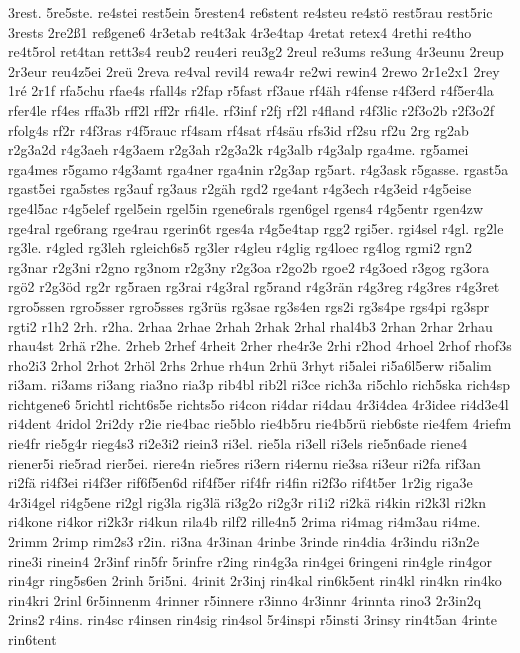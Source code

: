 {3rest.
5re5ste.
re4stei
rest5ein
5resten4
re6stent
re4steu
re4stö
rest5rau
rest5ric
3rests
2re2ß1
reßgene6
4r3etab
re4t3ak
4r3e4tap
4retat
retex4
4rethi
re4tho
re4t5rol
ret4tan
rett3s4
reub2
reu4eri
reu3g2
2reul
re3ums
re3ung
4r3eunu
2reup
2r3eur
reu4z5ei
2reü
2reva
re4val
revil4
rewa4r
re2wi
rewin4
2rewo
2r1e2x1
2rey
1ré
2r1f
rfa5chu
rfae4s
rfall4s
r2fap
r5fast
rf3aue
rf4äh
r4fense
r4f3erd
r4f5er4la
rfer4le
rf4es
rffa3b
rff2l
rff2r
rfi4le.
rf3inf
r2fj
rf2l
r4fland
r4f3lic
r2f3o2b
r2f3o2f
rfolg4s
rf2r
r4f3ras
r4f5rauc
rf4sam
rf4sat
rf4säu
rfs3id
rf2su
rf2u
2rg
rg2ab
r2g3a2d
r4g3aeh
r4g3aem
r2g3ah
r2g3a2k
r4g3alb
r4g3alp
rga4me.
rg5amei
rga4mes
r5gamo
r4g3amt
rga4ner
rga4nin
r2g3ap
rg5art.
r4g3ask
r5gasse.
rgast5a
rgast5ei
rga5stes
rg3auf
rg3aus
r2gäh
rgd2
rge4ant
r4g3ech
r4g3eid
r4g5eise
rge4l5ac
r4g5elef
rgel5ein
rgel5in
rgene6rals
rgen6gel
rgens4
r4g5entr
rgen4zw
rge4ral
rge6rang
rge4rau
rgerin6t
rges4a
r4g5e4tap
rgg2
rgi5er.
rgi4sel
r4gl.
rg2le
rg3le.
r4gled
rg3leh
rgleich6s5
rg3ler
r4gleu
r4glig
rg4loec
rg4log
rgmi2
rgn2
rg3nar
r2g3ni
r2gno
rg3nom
r2g3ny
r2g3oa
r2go2b
rgoe2
r4g3oed
r3gog
rg3ora
rgö2
r2g3öd
rg2r
rg5raen
rg3rai
r4g3ral
rg5rand
r4g3rän
r4g3reg
r4g3res
r4g3ret
rgro5ssen
rgro5sser
rgro5sses
rg3rüs
rg3sae
rg3s4en
rgs2i
rg3s4pe
rgs4pi
rg3spr
rgti2
r1h2
2rh.
r2ha.
2rhaa
2rhae
2rhah
2rhak
2rhal
rhal4b3
2rhan
2rhar
2rhau
rhau4st
2rhä
r2he.
2rheb
2rhef
4rheit
2rher
rhe4r3e
2rhi
r2hod
4rhoel
2rhof
rhof3s
rho2i3
2rhol
2rhot
2rhöl
2rhs
2rhue
rh4un
2rhü
3rhyt
ri5alei
ri5a6l5erw
ri5alim
ri3am.
ri3ams
ri3ang
ria3no
ria3p
rib4bl
rib2l
ri3ce
rich3a
ri5chlo
rich5ska
rich4sp
richtgene6
5richtl
richt6s5e
richts5o
ri4con
ri4dar
ri4dau
4r3i4dea
4r3idee
ri4d3e4l
ri4dent
4ridol
2ri2dy
r2ie
rie4bac
rie5blo
rie4b5ru
rie4b5rü
rieb6ste
rie4fem
4riefm
rie4fr
rie5g4r
rieg4s3
ri2e3i2
riein3
ri3el.
rie5la
ri3ell
ri3els
rie5n6ade
riene4
riener5i
rie5rad
rier5ei.
riere4n
rie5res
ri3ern
ri4ernu
rie3sa
ri3eur
ri2fa
rif3an
ri2fä
ri4f3ei
ri4f3er
rif6f5en6d
rif4f5er
rif4fr
ri4fin
ri2f3o
rif4t5er
1r2ig
riga3e
4r3i4gel
ri4g5ene
ri2gl
rig3la
rig3lä
ri3g2o
ri2g3r
ri1i2
ri2kä
ri4kin
ri2k3l
ri2kn
ri4kone
ri4kor
ri2k3r
ri4kun
rila4b
rilf2
rille4n5
2rima
ri4mag
ri4m3au
ri4me.
2rimm
2rimp
rim2s3
r2in.
ri3na
4r3inan
4rinbe
3rinde
rin4dia
4r3indu
ri3n2e
rine3i
rinein4
2r3inf
rin5fr
5rinfre
r2ing
rin4g3a
rin4gei
6ringeni
rin4gle
rin4gor
rin4gr
ring5s6en
2rinh
5ri5ni.
4rinit
2r3inj
rin4kal
rin6k5ent
rin4kl
rin4kn
rin4ko
rin4kri
2rinl
6r5innenm
4rinner
r5innere
r3inno
4r3innr
4rinnta
rino3
2r3in2q
2rins2
r4ins.
rin4sc
r4insen
rin4sig
rin4sol
5r4inspi
r5insti
3rinsy
rin4t5an
4rinte
rin6tent
}
